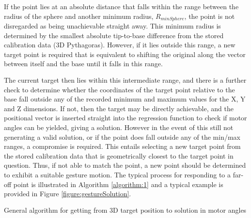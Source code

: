 \documentclass[11pt]{article}
\begin{document}
If the point lies at an absolute distance that falls within the range between the radius of the sphere and another minimum radius, $R_{minSphere}$, the point is not disregarded as being unachievable straight away. This minimum radius is determined by the smallest absolute tip-to-base difference from the stored calibration data (3D Pythagoras). However, if it lies outside this range, a new target point is required that is equivalent to shifting the original along the vector between itself and the base until it falls in this range. 

The current target then lies within this intermediate range, and there is a further check to determine whether the coordinates of the target point relative to the base fall outside any of the recorded minimum and maximum values for the X, Y and Z dimensions. If not, then the target may be directly achievable, and the positional vector is inserted straight into the regression function to check if motor angles can be yielded, giving a solution. However in the event of this still not generating a valid solution, or if the point does fall outside any of the min/max ranges, a compromise is required. This entails selecting a new target point from the stored calibration data that is geometrically closest to the target point in question. Thus, if not able to match the point, a new point should be determined to exhibit a suitable gesture motion. The typical process for responding to a far-off point is illustrated in Algorithm \ref{algorithm:1} and a typical example is provided in Figure \ref{figure:gestureSolution}.

\begin{algorithm}
\begin{algorithmic}
\ENDIF
{}
\ENDIF
{}
\ENDIF
{}
\ENDWHILE
\end{algorithmic}
\caption{General algorithm for getting from 3D target position to solution in motor angles}
\label{algorithm:1}
\end{algorithm}
\end{document}
